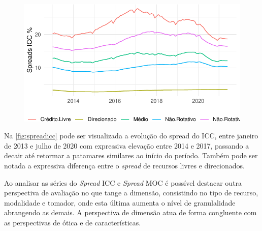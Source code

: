 \documentclass[12pt,12pt,openright,oneside,a4paper,chapter=TITLE,section=TITLE,subsection=TITLE,subsubsection=TITLE,english,french,spanish,portugues,sumario=tradicional]{abntex2}
\begin{document}
\begin{figure}

\begin{center}\includegraphics{12-exportedfigures/spread 2019 icc-1} \end{center}
\label{fig:spreadicc}
\end{figure}

Na \autoref{fig:spreadicc} pode ser visualizada a evolução do spread do ICC,
entre janeiro de 2013 e julho de 2020 com expressiva elevação entre 2014 e
2017, passando a decair até retormar a patamares similares ao início do
período. Também pode ser notada a expressiva diferença entre o \emph{spread} de
recursos livres e direcionados.

Ao analisar as séries do \emph{Spread} ICC e \emph{Spread} MOC é possível destacar outra perspectiva de avaliação no que tange a dimensão, consistindo no tipo de recurso, modalidade e tomador, onde esta última aumenta o nível de granulalidade abrangendo as demais. A perspectiva de dimensão atua de forma congluente com as perspectivas de ótica e de características.
\end{document}
